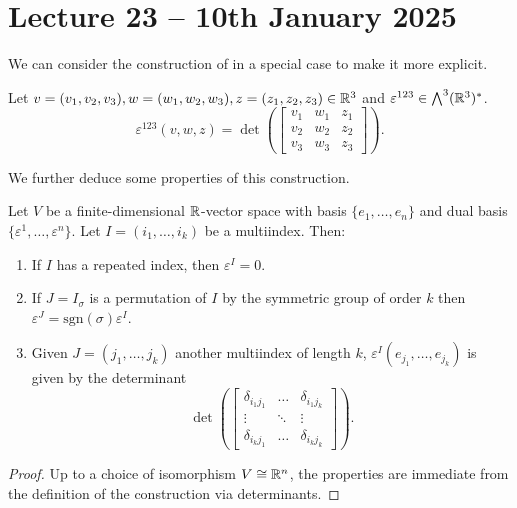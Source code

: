 \section{Lecture 23 -- 10th January 2025}\label{sec: lecture 23}
We can consider the construction of  in a special case to make it more explicit. 
\begin{example}
    Let $v=(v_{1},v_{2},v_{3}),w=(w_{1},w_{2},w_{3}),z=(z_{1},z_{2},z_{3})\in\mathbb{R}^{3}$ and $\varepsilon^{123}\in\bigwedge^{3}(\mathbb{R}^{3})^{*}$. 
    $$\varepsilon^{123}(v,w,z)=\det\left(\begin{bmatrix}
        v_{1} & w_{1} & z_{1} \\ v_{2} & w_{2} & z_{2} \\ v_{3} & w_{3} & z_{3}
    \end{bmatrix}\right).$$
\end{example}
We further deduce some properties of this construction. 
\begin{lemma}\label{lem: properties of dual basis construction}
    Let $V$ be a finite-dimensional $\mathbb{R}$-vector space with basis $\{e_{1},\dots,e_{n}\}$ and dual basis $\{\varepsilon^{1},\dots,\varepsilon^{n}\}$. Let $I=(i_{1},\dots,i_{k})$ be a multiindex. Then: 
    \begin{enumerate}[label=(\roman*)]
        \item If $I$ has a repeated index, then $\varepsilon^{I}=0$. 
        \item If $J=I_{\sigma}$ is a permutation of $I$ by the symmetric group of order $k$ then $\varepsilon^{J}=\mathrm{sgn}(\sigma)\varepsilon^{I}$. 
        \item Given $J=(j_{1},\dots,j_{k})$ another multiindex of length $k$, $\varepsilon^{I}(e_{j_{1}},\dots,e_{j_{k}})$ is given by the determinant 
        $$\det\left(\begin{bmatrix}
            \delta_{i_{1}j_{1}} & \dots & \delta_{i_{1}j_{k}} \\ 
            \vdots & \ddots & \vdots \\ 
            \delta_{i_{k}j_{1}} & \dots & \delta_{i_{k}j_{k}}
        \end{bmatrix}\right).$$
    \end{enumerate}
\end{lemma}
\begin{proof}
    Up to a choice of isomorphism $V\cong\mathbb{R}^{n}$, the properties are immediate from the definition of the construction  via determinants. 
\end{proof}
